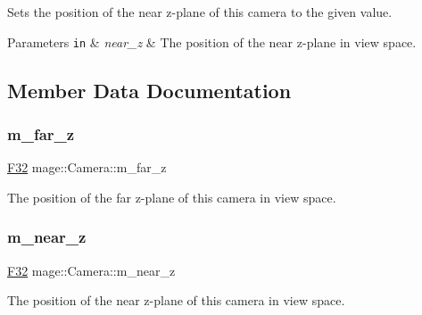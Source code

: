 Sets the position of the near z-\/plane of this camera to the given value.


\begin{DoxyParams}[1]{Parameters}
\mbox{\tt in}  & {\em near\+\_\+z} & The position of the near z-\/plane in view space. \\
\hline
\end{DoxyParams}


\subsection{Member Data Documentation}
\hypertarget{classmage_1_1_camera_a1073445c77b3224cd62613ae83853fe3}{}\label{classmage_1_1_camera_a1073445c77b3224cd62613ae83853fe3} 
\subsubsection{\texorpdfstring{m\+\_\+far\+\_\+z}{m\_far\_z}}
{\footnotesize\ttfamily \hyperlink{namespacemage_aa97e833b45f06d60a0a9c4fc22ae02c0}{F32} mage\+::\+Camera\+::m\+\_\+far\+\_\+z\hspace{0.3cm}{\ttfamily [private]}}

The position of the far z-\/plane of this camera in view space. \hypertarget{classmage_1_1_camera_a8ae2c8fbe94cb6f8c4cd4a2811900b83}{}\label{classmage_1_1_camera_a8ae2c8fbe94cb6f8c4cd4a2811900b83} 
\subsubsection{\texorpdfstring{m\+\_\+near\+\_\+z}{m\_near\_z}}
{\footnotesize\ttfamily \hyperlink{namespacemage_aa97e833b45f06d60a0a9c4fc22ae02c0}{F32} mage\+::\+Camera\+::m\+\_\+near\+\_\+z\hspace{0.3cm}{\ttfamily [private]}}

The position of the near z-\/plane of this camera in view space. 